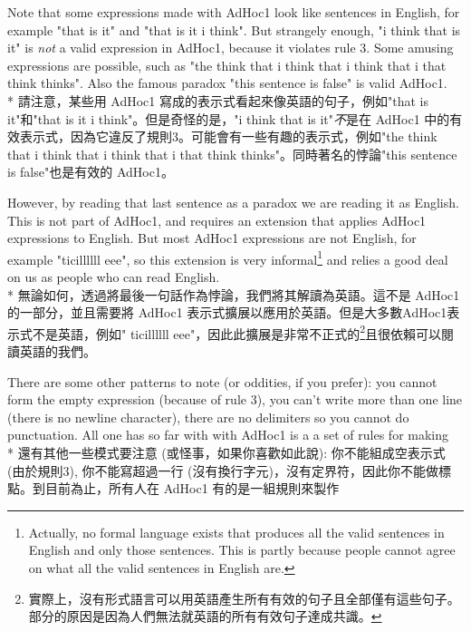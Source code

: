 \documentclass[]{article}
\begin{document}
{\color{gray}Note that some expressions made with AdHoc1 look like sentences in English, for example "that is it" and "that is it i think". But strangely enough, "i think that is it" is \emph{not} a valid expression in AdHoc1, because it violates rule 3. Some amusing expressions are possible, such as "the think that i think that i think that i that think thinks". Also the famous paradox "this sentence is false" is valid AdHoc1.}
\\*
{請注意，某些用 AdHoc1 寫成的表示式看起來像英語的句子，例如"that is it"和"that is it i think"。但是奇怪的是，"i think that is it"\emph{不}是在 AdHoc1 中的有效表示式，因為它違反了規則3。可能會有一些有趣的表示式，例如"the think that i think that i think that i that think thinks"。同時著名的悖論"this sentence is false"也是有效的 AdHoc1。}

{\color{gray}However, by reading that last sentence as a paradox we are reading it as English. This is not part of AdHoc1, and requires an extension that applies AdHoc1 expressions to English. But most AdHoc1 expressions are not English, for example "ticillllll eee", so this extension is very informal\footnote{Actually, no formal language exists that produces all the valid sentences in English and only those sentences. This is partly because people cannot agree on what all the valid sentences in English are.} and relies a good deal on us as people who can read English.}
\\*
{無論如何，透過將最後一句話作為悖論，我們將其解讀為英語。這不是 AdHoc1 的一部分，並且需要將 AdHoc1 表示式擴展以應用於英語。但是大多數AdHoc1表示式不是英語，例如" ticillllll eee"，因此此擴展是非常不正式的\footnote{實際上，沒有形式語言可以用英語產生所有有效的句子且全部僅有這些句子。部分的原因是因為人們無法就英語的所有有效句子達成共識。}且很依賴可以閱讀英語的我們。}

{\color{gray}There are some other patterns to note (or oddities, if you prefer): you cannot form the empty expression (because of rule 3), you can't write more than one line (there is no newline character), there are no delimiters so you cannot do punctuation. All one has so far {\color{cyan}with with} AdHoc1 is {\color{cyan}a a} set of rules for {\color{cyan}making}}
\\*
{還有其他一些模式要注意 (或怪事，如果你喜歡如此說): 你不能組成空表示式 (由於規則3), 你不能寫超過一行 (沒有換行字元)，沒有定界符，因此你不能做標點。到目前為止，所有人在 AdHoc1 有的是一組規則來製作}
\end{document}
